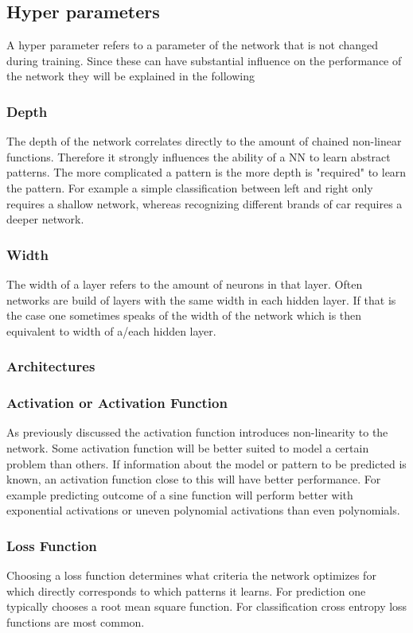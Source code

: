 			
		 
		\subsection{Hyper parameters}
			\label{HyperPar}
			A hyper parameter refers to a parameter of the network that is not changed during training. Since these can have substantial influence on the performance of the network they will be explained in the following
			\subsubsection{Depth}
				The depth of the network correlates directly to the amount of chained non-linear functions. Therefore it strongly influences the ability of a NN to learn abstract patterns. The more complicated a pattern is the more depth is "required" to learn the pattern. For example a simple classification between left and right only requires a shallow network, whereas recognizing different brands of car requires a deeper network.
			\subsubsection{Width}
				The width of a layer refers to the amount of neurons in that layer. Often networks are build of layers with the same width in each hidden layer. If that is the case one sometimes speaks of the width of the network which is then equivalent to width of a/each hidden layer.
			\subsubsection{Architectures}
			\subsubsection{Activation or Activation Function}
				As previously discussed the activation function introduces non-linearity to the network. Some activation function will be better suited to model a certain problem than others. If information about the model or pattern to be predicted is known, an activation function close to this will have better performance. For example predicting outcome of a sine function will perform better with exponential activations or uneven polynomial activations than even polynomials.%
			\subsubsection{Loss Function}
				Choosing a loss function determines what criteria the network optimizes for which directly corresponds to which patterns it learns. For prediction one typically chooses a root mean square function. For classification cross entropy loss functions are most common.
